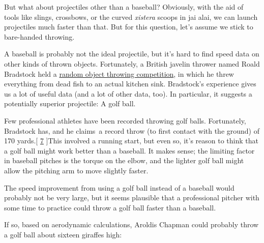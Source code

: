 {{But what about projectiles other than a baseball? Obviously, with the aid of tools like slings, crossbows, or the curved \emph{xistera} scoops in jai alai, we can launch projectiles much faster than that. But for this question, let’s assume we stick to bare-handed throwing.}

{A baseball is probably not the ideal projectile, but it’s hard to find speed data on other kinds of thrown objects. Fortunately, a British javelin thrower named Roald Bradstock held a \href{http://www.youtube.com/watch?v=78OPnVweKeg}{random object throwing competition}, in which he threw everything from dead fish to an actual kitchen sink. Bradstock’s experience gives us a lot of useful data (and a lot of other data, too). In particular, it suggests a potentially superior projectile: A golf ball.}

{Few professional athletes have been recorded throwing golf balls. Fortunately, Bradstock has, and he claims a record throw (to first contact with the ground) of 170 yards.[ \href{http://recordsetter.com/world-record/world-record-for-throwing-golf-ball/7349\#contentsection}{7} ]This involved a running start, but even so, it’s reason to think that a golf ball might work better than a baseball. It makes sense; the limiting factor in baseball pitches is the torque on the elbow, and the lighter golf ball might allow the pitching arm to move slightly faster.}

{The speed improvement from using a golf ball instead of a baseball would probably not be very large, but it seems plausible that a professional pitcher with some time to practice could throw a golf ball faster than a baseball.}

{If so, based on aerodynamic calculations, Aroldis Chapman could probably throw a golf ball about sixteen giraffes high:}

}
